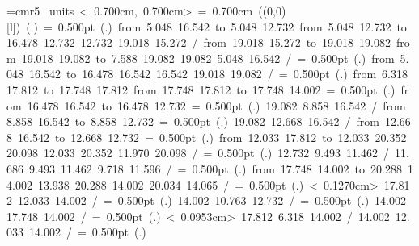 \font\thinlinefont=cmr5
\mbox{\beginpicture
\setcoordinatesystem units < 0.700cm, 0.700cm>
\unitlength= 0.700cm
\linethickness=1pt
\setplotsymbol ({\makebox(0,0)[l]{\tencirc{}}})
\setshadesymbol ({\thinlinefont .})
\setlinear
%
%
\linethickness= 0.500pt
\setplotsymbol ({\thinlinefont .})
\putrule from  5.048 16.542 to  5.048 12.732
\putrule from  5.048 12.732 to 16.478 12.732
 12.732 19.018 15.272 /
\putrule from 19.018 15.272 to 19.018 19.082
\putrule from 19.018 19.082 to  7.588 19.082
 19.082  5.048 16.542 /
%
%
\linethickness= 0.500pt
\setplotsymbol ({\thinlinefont .})
\putrule from  5.048 16.542 to 16.478 16.542
 16.542 19.018 19.082 /
%
%
\linethickness= 0.500pt
\setplotsymbol ({\thinlinefont .})
\putrule from  6.318 17.812 to 17.748 17.812
\putrule from 17.748 17.812 to 17.748 14.002
%
%
\linethickness= 0.500pt
\setplotsymbol ({\thinlinefont .})
\putrule from 16.478 16.542 to 16.478 12.732
%
%
\linethickness= 0.500pt
\setplotsymbol ({\thinlinefont .})
 19.082  8.858 16.542 /
\putrule from  8.858 16.542 to  8.858 12.732
%
%
\linethickness= 0.500pt
\setplotsymbol ({\thinlinefont .})
 19.082 12.668 16.542 /
\putrule from 12.668 16.542 to 12.668 12.732
%
%
\linethickness= 0.500pt
\setplotsymbol ({\thinlinefont .})
\putrule from 12.033 17.812 to 12.033 20.352
%
%
 20.098 12.033 20.352 11.970 20.098 /
%
%
%
\linethickness= 0.500pt
\setplotsymbol ({\thinlinefont .})
 12.732  9.493 11.462 /
%
%
 11.686  9.493 11.462  9.718 11.596 /
%
%
%
\linethickness= 0.500pt
\setplotsymbol ({\thinlinefont .})
\putrule from 17.748 14.002 to 20.288 14.002
%
%
 13.938 20.288 14.002 20.034 14.065 /
%
%
%
\linethickness= 0.500pt
\setplotsymbol ({\thinlinefont .})
\setdashes < 0.1270cm>
 17.812 12.033 14.002 /
%
%
\linethickness= 0.500pt
\setplotsymbol ({\thinlinefont .})
 14.002 10.763 12.732 /
%
%
\linethickness= 0.500pt
\setplotsymbol ({\thinlinefont .})
 14.002 17.748 14.002 /
%
%
\linethickness= 0.500pt
\setplotsymbol ({\thinlinefont .})
\setdots < 0.0953cm>
 17.812  6.318 14.002 /
 14.002 12.033 14.002 /
%
%
\linethickness= 0.500pt
\setplotsymbol ({\thinlinefont .})
}

